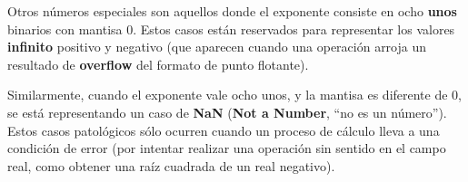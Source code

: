 \documentclass[spanish,A4,]{article}
\begin{document}
Otros números especiales son aquellos donde el exponente consiste en
ocho \textbf{unos} binarios con mantisa 0. Estos casos están reservados
para representar los valores \textbf{infinito} positivo y negativo (que
aparecen cuando una operación arroja un resultado de \textbf{overflow}
del formato de punto flotante).

Similarmente, cuando el exponente vale ocho unos, y la mantisa es
diferente de 0, se está representando un caso de \textbf{NaN}
(\textbf{Not a Number}, ``no es un número''). Estos casos patológicos
sólo ocurren cuando un proceso de cálculo lleva a una condición de error
(por intentar realizar una operación sin sentido en el campo real, como
obtener una raíz cuadrada de un real negativo).
\end{document}
